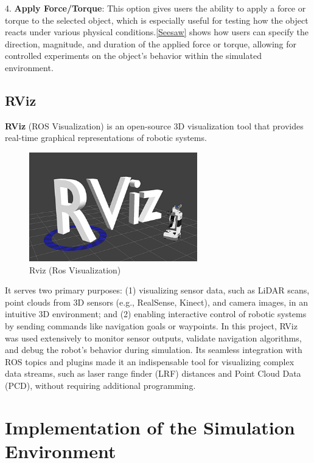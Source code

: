 \documentclass[../../main]{subfiles}
\begin{document}
4. \textbf{Apply Force/Torque}: This option gives users the ability to apply a force or 
torque to the selected object, which is especially useful for testing how the object reacts 
under various physical conditions.\cref{Seesaw} shows how users can specify the direction, magnitude, and duration 
of the applied force or torque, allowing for controlled experiments on the object’s behavior 
within the simulated environment.
\newpage
\subsection{RViz}
\textbf{RViz} (ROS Visualization) is an open-source 3D visualization tool that provides real-time graphical representations of robotic systems. 

\begin{figure}[H]
    \centering
\includegraphics[width=0.65\textwidth]{fig/rviz_logo.png}
\caption{Rviz (Ros Visualization)}
\label{Rviz Logo} %
\end{figure}

It serves two primary purposes: (1) visualizing sensor data, such as LiDAR scans, point clouds from 3D sensors (e.g., RealSense, Kinect), 
and camera images, in an intuitive 3D environment; and (2) enabling interactive control of robotic systems by sending commands 
like navigation goals or waypoints. In this project, RViz was used extensively to monitor sensor outputs, validate navigation algorithms, 
and debug the robot’s behavior during simulation. Its seamless integration with ROS topics and plugins made it an indispensable tool for 
visualizing complex data streams, such as laser range finder (LRF) distances and Point Cloud Data (PCD), without requiring additional programming.  
\newpage
\section{Implementation of the Simulation Environment}
\end{document}
